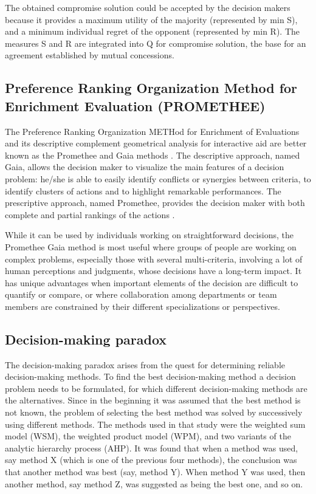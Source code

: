 The obtained compromise solution could be accepted by the decision makers because it provides a maximum utility of the majority (represented by min S), and a minimum individual regret of the opponent (represented by min R). The measures S and R are integrated into Q for compromise solution, the base for an agreement established by mutual concessions.

\subsection{Preference Ranking Organization Method for Enrichment Evaluation (PROMETHEE)}
The Preference Ranking Organization METHod for Enrichment of Evaluations and its descriptive complement geometrical analysis for interactive aid are better known as the Promethee and Gaia methods \cite{Promethee}.
The descriptive approach, named Gaia, allows the decision maker to visualize the main features of a decision problem: he/she is able to easily identify conflicts or synergies between criteria, to identify clusters of actions and to highlight remarkable performances.
The prescriptive approach, named Promethee, provides the decision maker with both complete and partial rankings of the actions \cite{PROMETHEE_MLwiki}.

While it can be used by individuals working on straightforward decisions, the Promethee Gaia method is most useful where groups of people are working on complex problems, especially those with several multi-criteria, involving a lot of human perceptions and judgments, whose decisions have a long-term impact. It has unique advantages when important elements of the decision are difficult to quantify or compare, or where collaboration among departments or team members are constrained by their different specializations or perspectives.

\subsection{Decision-making paradox}
The decision-making paradox arises from the quest for determining reliable decision-making methods.
To find the best decision-making method a decision problem needs to be formulated, for which different decision-making methods are the alternatives. 
Since in the beginning it was assumed that the best method is not known, the problem of selecting the best method was solved by successively using different methods. The methods used in that study \cite{DecisionMakingParadox} were the weighted sum model (WSM), the weighted product model (WPM), and two variants of the analytic hierarchy process (AHP). It was found that when a method was used, say method X (which is one of the previous four methods), the conclusion was that another method was best (say, method Y). When method Y was used, then another method, say method Z, was suggested as being the best one, and so on.

